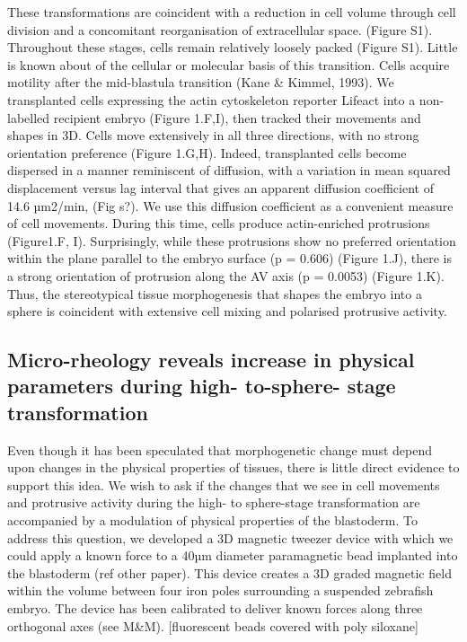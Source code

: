 These transformations are coincident with a reduction in cell volume through cell division and a concomitant reorganisation of extracellular space. (Figure S1).
Throughout these stages, cells remain relatively loosely packed (Figure S1). Little is known about of the cellular or molecular basis of this transition.
Cells acquire motility after the mid-blastula transition (Kane \& Kimmel, 1993). We transplanted cells expressing the actin cytoskeleton reporter Lifeact into a non-labelled recipient embryo (Figure 1.F,I), then tracked their movements and shapes in 3D.
Cells move extensively in all three directions, with no strong orientation preference (Figure 1.G,H).
Indeed, transplanted cells become dispersed in a manner reminiscent of diffusion, with a variation in mean squared displacement versus lag interval that gives an apparent diffusion coefficient of 14.6 µm2/min, (Fig s?).
We use this diffusion coefficient as a convenient measure of cell movements. During this time, cells produce actin-enriched protrusions (Figure1.F, I).
Surprisingly, while these protrusions show no preferred orientation within the plane parallel to the embryo surface (p = 0.606) (Figure 1.J), there is a strong orientation of protrusion along the AV axis (p = 0.0053) (Figure 1.K).
Thus, the stereotypical tissue morphogenesis that shapes the embryo into a sphere is coincident with extensive cell mixing and polarised protrusive activity.
\subsection{Micro-rheology reveals increase in physical parameters during high- to-sphere- stage transformation}
Even though it has been speculated that morphogenetic change must depend upon changes in the physical properties of tissues, there is little direct evidence to support this idea.
We wish to ask if the changes that we see in cell movements and protrusive activity during the high- to sphere-stage transformation are accompanied by a modulation of physical properties of the blastoderm.
To address this question, we developed a 3D magnetic tweezer device with which we could apply a known force to a 40µm diameter paramagnetic bead implanted into the blastoderm (ref other paper).
This device creates a 3D graded magnetic field within the volume between four iron poles surrounding a suspended zebrafish embryo.
The device has been calibrated to deliver known forces along three orthogonal axes (see M\&M).
[fluorescent beads covered with poly siloxane]

